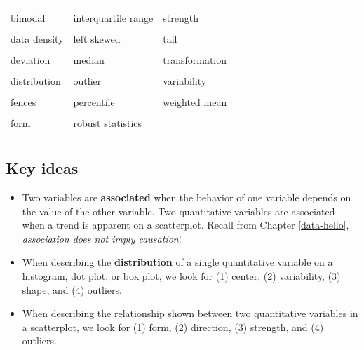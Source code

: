 \documentclass[
  10pt,
  openany]{book}
\theoremstyle{definition}
\theoremstyle{definition}
\theoremstyle{definition}
\theoremstyle{definition}
\theoremstyle{remark}
\begin{document}
\begin{tabu} to 
\toprule
{} &  & \\
bimodal & interquartile range & strength\\
 &  & \\
data density & left skewed & tail\\
 &  & \\
deviation & median & transformation\\
 &  & \\
distribution & outlier & variability\\
 &  & \\
fences & percentile & weighted mean\\
 &  & \\
form & robust statistics & \\
 &  & \\
\bottomrule
\end{tabu}

\subsection*{Key ideas}\label{key-ideas-3}

\begin{itemize}
\item
  Two variables are \textbf{associated} when the behavior of one variable depends on the value of the other variable. Two quantitative variables are associated when a trend is apparent on a scatterplot. Recall from Chapter \ref{data-hello}, \emph{association does not imply causation}!
\item
  When describing the \textbf{distribution} of a single quantitative variable on a histogram, dot plot, or box plot, we look for (1) center, (2) variability, (3) shape, and (4) outliers.
\item
  When describing the relationship shown between two quantitative variables in a scatterplot, we look for (1) form, (2) direction, (3) strength, and (4) outliers.
\end{itemize}
\end{document}
